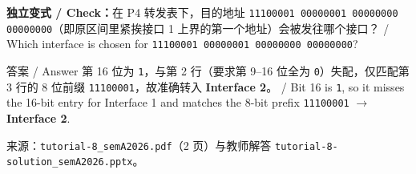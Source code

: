 \textbf{独立变式 / Check：}在 P4 转发表下，目的地址 \texttt{11100001 00000001 00000000 00000000}（即原区间里紧挨接口 1 上界的第一个地址）会被发往哪个接口？ / Which interface is chosen for \texttt{11100001 00000001 00000000 00000000}?

\begin{StudySolution}{答案 / Answer}
第 16 位为 \texttt{1}，与第 2 行（要求第 9–16 位全为 \texttt{0}）失配，仅匹配第 3 行的 8 位前缀 \texttt{11100001}，故准确转入 \textbf{Interface 2}。 / Bit 16 is \texttt{1}, so it misses the 16-bit entry for Interface 1 and matches the 8-bit prefix \texttt{11100001} $\to$ \textbf{Interface 2}.
\end{StudySolution}

来源：\texttt{tutorial-8\_semA2026.pdf}（2 页）与教师解答 \texttt{tutorial-8-solution\_semA2026.pptx}。
